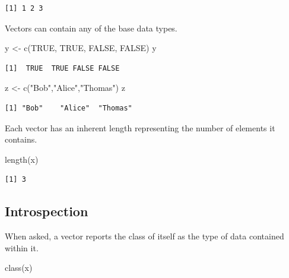 \documentclass[
  letterpaper,
]{book}
\newenvironment{Shaded}{\begin{snugshade}}{\end{snugshade}}
\newcommand{\ConstantTok}[1]{\textcolor[rgb]{0.56,0.35,0.01}{#1}}
\newcommand{\FunctionTok}[1]{\textcolor[rgb]{0.28,0.35,0.67}{#1}}
\newcommand{\NormalTok}[1]{\textcolor[rgb]{0.00,0.23,0.31}{#1}}
\newcommand{\OtherTok}[1]{\textcolor[rgb]{0.00,0.23,0.31}{#1}}
\newcommand{\StringTok}[1]{\textcolor[rgb]{0.13,0.47,0.30}{#1}}
\begin{document}
\begin{verbatim}
[1] 1 2 3
\end{verbatim}

Vectors can contain any of the base data types.

\begin{Shaded}
\begin{Highlighting}[]
\NormalTok{y }\OtherTok{\textless{}{-}} \FunctionTok{c}\NormalTok{(}\ConstantTok{TRUE}\NormalTok{, }\ConstantTok{TRUE}\NormalTok{, }\ConstantTok{FALSE}\NormalTok{, }\ConstantTok{FALSE}\NormalTok{)}
\NormalTok{y}
\end{Highlighting}
\end{Shaded}

\begin{verbatim}
[1]  TRUE  TRUE FALSE FALSE
\end{verbatim}

\begin{Shaded}
\begin{Highlighting}[]
\NormalTok{z }\OtherTok{\textless{}{-}} \FunctionTok{c}\NormalTok{(}\StringTok{"Bob"}\NormalTok{,}\StringTok{"Alice"}\NormalTok{,}\StringTok{"Thomas"}\NormalTok{)}
\NormalTok{z}
\end{Highlighting}
\end{Shaded}

\begin{verbatim}
[1] "Bob"    "Alice"  "Thomas"
\end{verbatim}

Each vector has an inherent length representing the number of elements
it contains.

\begin{Shaded}
\begin{Highlighting}[]
\FunctionTok{length}\NormalTok{(x)}
\end{Highlighting}
\end{Shaded}

\begin{verbatim}
[1] 3
\end{verbatim}

\subsection{Introspection}\label{introspection-1}

When asked, a vector reports the class of itself as the type of data
contained within it.

\begin{Shaded}
\begin{Highlighting}[]
\FunctionTok{class}\NormalTok{(x)}
\end{Highlighting}
\end{Shaded}
\end{document}
